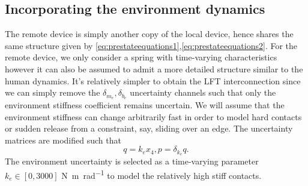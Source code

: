 \subsection{Incorporating the environment dynamics}
The remote device is simply another copy of the local device, hence shares the same structure given by
\eqref{eq:prestateequations1},\eqref{eq:prestateequations2}. For the remote device, we only consider a spring with time-varying 
characteristics however it can also be assumed to admit a more detailed structure similar to the human dynamics. It's relatively 
simpler to obtain the LFT interconnection since we can simply remove the $\delta_{m_e},\delta_{b_e}$ uncertainty channels such 
that only the environment stiffness coefficient remains uncertain. We will assume that the environment stiffness can change 
arbitrarily fast in order to model hard contacts or sudden release from a constraint, say, sliding over an edge. The uncertainty 
matrices are modified such that
\[
q = k_e x_4, p = \delta_{k_e} q.
\]
The environment uncertainty is selected as a time-varying parameter $k_e\in[0,3000]$ \si{\newton\meter\per\radian} to model 
the relatively high stiff contacts.


